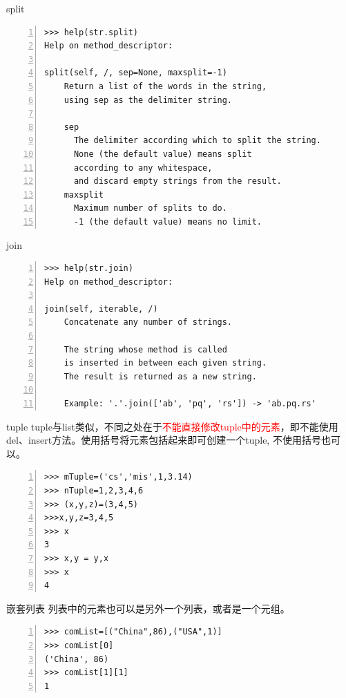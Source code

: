 \documentclass{beamer}
\begin{document}
\begin{frame}[fragile]{split}

\begin{Verbatim}[numbers=left,frame=single,rulecolor=\color{red}]
>>> help(str.split)
Help on method_descriptor:

split(self, /, sep=None, maxsplit=-1)
    Return a list of the words in the string, 
    using sep as the delimiter string.
    
    sep
      The delimiter according which to split the string.
      None (the default value) means split 
      according to any whitespace,
      and discard empty strings from the result.
    maxsplit
      Maximum number of splits to do.
      -1 (the default value) means no limit.
\end{Verbatim}
\end{frame}
\begin{frame}[fragile]{join}

\begin{Verbatim}[numbers=left,frame=single,rulecolor=\color{red}]
>>> help(str.join)
Help on method_descriptor:

join(self, iterable, /)
    Concatenate any number of strings.
    
    The string whose method is called 
    is inserted in between each given string.
    The result is returned as a new string.
    
    Example: '.'.join(['ab', 'pq', 'rs']) -> 'ab.pq.rs'
\end{Verbatim}
\end{frame}



\begin{frame}[fragile]{tuple}
tuple与list类似，不同之处在于\textcolor{red}{不能直接修改tuple中的元素}，即不能使用del、insert方法。使用括号将元素包括起来即可创建一个tuple, 不使用括号也可以。
\begin{block}{}
\begin{Verbatim}[numbers=left,frame=single,rulecolor=\color{red}]
>>> mTuple=('cs','mis',1,3.14)
>>> nTuple=1,2,3,4,6
>>> (x,y,z)=(3,4,5)
>>>x,y,z=3,4,5
>>> x
3
>>> x,y = y,x
>>> x
4
\end{Verbatim}
\end{block}

\end{frame}

\begin{frame}[fragile]{嵌套列表}
列表中的元素也可以是另外一个列表，或者是一个元组。
\begin{block}{}
\begin{Verbatim}[numbers=left,frame=single,rulecolor=\color{red}]
>>> comList=[("China",86),("USA",1)]
>>> comList[0]
('China', 86)
>>> comList[1][1]
1
\end{Verbatim}
\end{block}

\end{frame}
\end{document}
